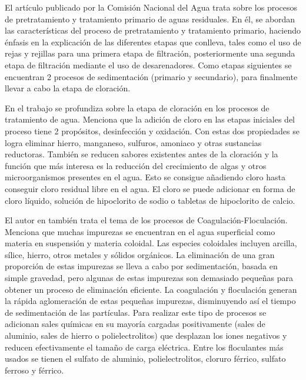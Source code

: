 El artículo \cite{conaguaManualPotabilización} publicado por la Comisión Nacional del Agua trata sobre los procesos de pretratamiento y tratamiento primario de aguas residuales.
En él, se abordan las características del proceso de pretratamiento y tratamiento primario, haciendo énfasis en la explicación de las diferentes etapas que conlleva, tales como 
el uso de rejas y rejillas para una primera etapa de filtración, posteriormente una segunda etapa de filtración mediante el uso de desarenadores. Como etapas siguientes se 
encuentran 2 procesos de sedimentación (primario y secundario), para finalmente llevar a cabo la etapa de cloración.  

En el trabajo \cite{paper01_MynorRomero} se profundiza sobre la etapa de cloración en los procesos de tratamiento de agua. Menciona que la adición de cloro en las etapas iniciales del proceso tiene 2 propósitos, desinfección y oxidación. Con estas dos propiedades se 
logra eliminar hierro, manganeso, sulfuros, amoniaco y otras sustancias reductoras. También se reducen sabores existentes antes de la cloración y la función que más interesa es la reducción del crecimiento de algas y otros      
microorganismos presentes en el agua. Esto se consigue añadiendo cloro hasta conseguir cloro residual libre en el agua. El cloro se puede adicionar en forma de cloro líquido, solución de hipoclorito de sodio o tabletas de 
hipoclorito de calcio.

El autor en \cite{paper01_MynorRomero} también trata el tema de los procesos de Coagulación-Floculación. Menciona que muchas impurezas se encuentran en el agua superficial como materia en suspensión y materia coloidal. Las    
especies coloidales incluyen arcilla, sílice, hierro, otros metales y sólidos orgánicos. La eliminación de una gran proporción de estas impurezas se lleva a cabo por sedimentación, basada en simple gravedad, pero algunas 
de estas impurezas son demasiado pequeñas para obtener un proceso de eliminación eficiente. La coagulación y floculación generan la rápida aglomeración de estas pequeñas impurezas, disminuyendo así el tiempo de sedimentación 
de las partículas. Para realizar este tipo de procesos se adicionan sales químicas en su mayoría cargadas positivamente (sales de aluminio, sales de hierro o polielectrolitos) que desplazan los iones negativos y reducen 
efectivamente el tamaño de carga eléctrica. Entre los floculantes más usados se tienen el sulfato de aluminio, polielectrolitos, cloruro férrico, sulfato ferroso y férrico.


